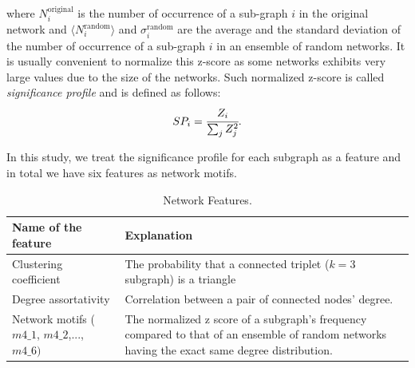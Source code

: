 where $N_i^{\text{original}}$ is the number of occurrence of a sub-graph $i$ in the original network and $ \langle N_i^{\text{random}} \rangle$ and $\sigma_i^{\text{random}}$ are the average and the standard deviation of the number of occurrence of a sub-graph $i$ in an ensemble of random networks. It is usually convenient to normalize this z-score as some networks exhibits very large values due to the size of the networks. Such normalized z-score is called \textit{significance profile} and is defined as follows:
	\begin{equation}
	SP_i = \cfrac{Z_i}{\sum_j Z_j^2}.
	\end{equation}
	
In this study, we treat the significance profile for each subgraph as a feature and in total we have six features as network motifs.
\newline


\begin{table}[htb]
    \caption{Network Features.}
    \begin{tabular}{| l | p{3cm} |} \hline
      Name of the feature & Explanation  \\ \hline \hline
      Clustering coefficient &  The probability that a connected triplet ($k=3$ subgraph) is a triangle \\  %
      Degree assortativity &  Correlation between a pair of connected nodes' degree. \\  %
      Network motifs ($m4\_1$, $m4\_2$,..., $m4\_6)$& The normalized z score of a subgraph's frequency compared to that of an ensemble of random networks having the exact same degree distribution. \\ \hline
    \end{tabular}
    \label{tab:feature}
\end{table}
